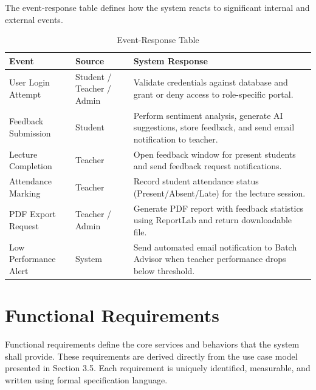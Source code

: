The event-response table defines how the system reacts to significant internal and external events.

\begin{table}[H]
\centering
\caption{Event-Response Table}

\begin{tabularx}{\textwidth}{
|>{\raggedright\arraybackslash}p{3cm}
|>{\raggedright\arraybackslash}p{3.5cm}
|>{\raggedright\arraybackslash}X|}

\hline
\textbf{Event} & \textbf{Source} & \textbf{System Response} \\ \hline

User Login Attempt & Student / Teacher / Admin & Validate credentials against database and grant or deny access to role-specific portal. \\ \hline

Feedback Submission & Student & Perform sentiment analysis, generate AI suggestions, store feedback, and send email notification to teacher. \\ \hline

Lecture Completion & Teacher & Open feedback window for present students and send feedback request notifications. \\ \hline

Attendance Marking & Teacher & Record student attendance status (Present/Absent/Late) for the lecture session. \\ \hline

PDF Export Request & Teacher / Admin & Generate PDF report with feedback statistics using ReportLab and return downloadable file. \\ \hline

Low Performance Alert & System & Send automated email notification to Batch Advisor when teacher performance drops below threshold. \\ \hline

\end{tabularx}

\end{table}

\section{Functional Requirements}

Functional requirements define the core services and behaviors that the system shall provide. 
These requirements are derived directly from the use case model presented in Section 3.5. 
Each requirement is uniquely identified, measurable, and written using formal specification language.

